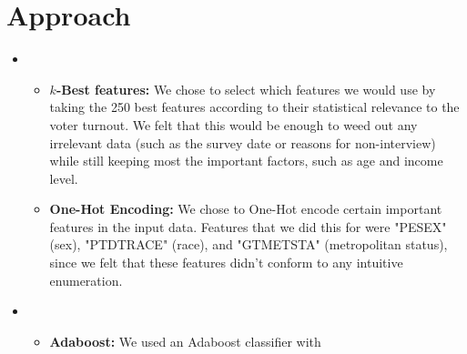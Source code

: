 \section{Approach}
\medskip
\begin{itemize}

    \item {}
    \begin{itemize}
    \item \textbf{$k$-Best features:}
    We chose to select which features we would use by taking the 250 best features according to their statistical relevance to the voter turnout. We felt that this would be enough to weed out any irrelevant data (such as the survey date or reasons for non-interview) while still keeping most the important factors, such as age and income level.

    \item \textbf{One-Hot Encoding:}
    We chose to One-Hot encode certain important features in the input data. Features that we did this for were "PESEX" (sex), "PTDTRACE" (race), and "GTMETSTA" (metropolitan status), since we felt that these features didn't conform to any intuitive enumeration.

    \end{itemize}

    \item {}
    \begin{itemize}
    \item \textbf{Adaboost:} We used an Adaboost classifier with %


    \end{itemize}

\end{itemize}



